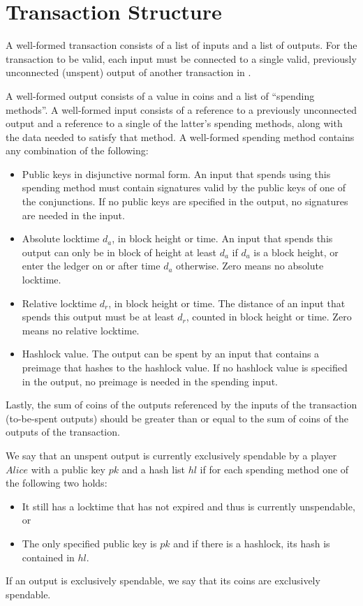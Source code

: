 \section{Transaction Structure}
  \label{appendix:txstructure}
  A well-formed transaction consists of a list of inputs and a list of outputs.
  For the transaction to be valid, each input must be connected to a single
  valid, previously unconnected (unspent) output of another transaction in
  \ledger.

  A well-formed output consists of a value in coins and a list of ``spending
  methods''. A well-formed input consists of a reference to a previously
  unconnected output and a reference to a single of the latter's spending
  methods, along with the data needed to satisfy that method. A well-formed
  spending method contains any combination of the following:
  \begin{itemize}
    \item Public keys in disjunctive normal form. An input that spends using
    this spending method must contain signatures valid by the public keys of one
    of the conjunctions. If no public keys are specified in the output, no
    signatures are needed in the input.
    \item Absolute locktime $d_a$, in block height or time. An input that spends
    this output can only be in block of height at least $d_a$ if $d_a$ is a
    block height, or enter the ledger on or after time $d_a$ otherwise. Zero
    means no absolute locktime.
    \item Relative locktime $d_r$, in block height or time. The distance of an
    input that spends this output must be at least $d_r$, counted in block
    height or time. Zero means no relative locktime.
    \item Hashlock value. The output can be spent by an input that contains a
    preimage that hashes to the hashlock value. If no hashlock value is
    specified in the output, no preimage is needed in the spending input.
  \end{itemize}

  Lastly, the sum of coins of the outputs referenced by the inputs of the
  transaction (to-be-spent outputs) should be greater than or equal to the sum
  of coins of the outputs of the transaction.

  We say that an unspent output is currently exclusively spendable by a player
  $Alice$ with a public key $pk$ and a hash list $hl$ if for each spending
  method one of the following two holds:
  \begin{itemize}
    \item It still has a locktime that has not expired and thus is currently
    unspendable, or
    \item The only specified public key is $pk$ and if there is a hashlock, its
    hash is contained in $hl$.
  \end{itemize}
  If an output is exclusively spendable, we say that its coins are exclusively
  spendable.
  \newpage

